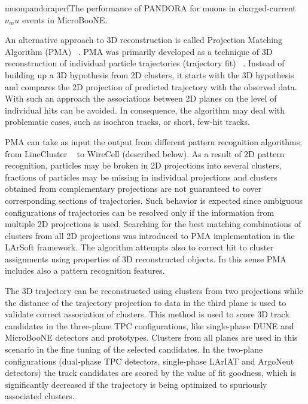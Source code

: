 \begin{cdrfigure}{muonpandoraperf}{The performance of PANDORA for muons in charged-current
  $\nu_mu$ events in MicroBooNE. }
\end{cdrfigure}


An alternative approach to 3D reconstruction is called Projection Matching Algorithm
(PMA) ~\cite{pma_algorithm}. PMA was primarily developed as a technique of 3D reconstruction
of individual particle trajectories (trajectory fit) ~\cite{icarus3dreco}. Instead of
building up a 3D hypothesis from 2D clusters, it starts with the 3D hypothesis and compares
the 2D projection of predicted trajectory with the observed data. With such an approach
the associations between 2D planes on the level of individual hits can be avoided.
In consequence, the algorithm may deal with problematic cases, such as isochron tracks,
or short, few-hit tracks.

PMA can take as input the output from different pattern recognition algorithms, from
LineCluster ~\cite{linecluster} to WireCell (described below). As a result of 2D pattern
recognition, particles may be broken in 2D projections into several clusters, fractions
of particles may be missing in individual projections and clusters obtained from complementary
projections are not guaranteed to cover corresponding sections of trajectories. Such behavior
is expected since ambiguous configurations of trajectories can be resolved only if the information
from multiple 2D projections is used. Searching for the best matching combinations of clusters from
all 2D projections was introduced to PMA implementation in the LArSoft framework. The algorithm
attempts also to correct hit to cluster assignments using properties of 3D reconstructed objects.
In this sense PMA includes also a pattern recognition features.

The 3D trajectory can be reconstructed using clusters from two projections while the distance of
the trajectory projection to data in the third plane is used to validate correct association of clusters.
This method is used to score 3D track candidates in the three-plane TPC configurations, like single-phase
DUNE and MicroBooNE detectors and prototypes. Clusters from all planes are used in this scenario in the
fine tuning of the selected candidates. In the two-plane configurations (dual-phase TPC detectors, single-phase
LArIAT and ArgoNeut detectors) the track candidates are scored by the value of fit goodness, which is
significantly decreased if the trajectory is being optimized to spuriously associated clusters.

